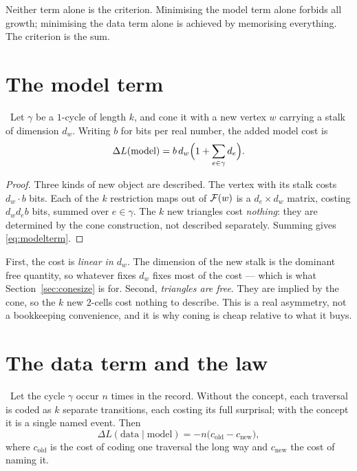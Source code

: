 Neither term alone is the criterion. Minimising the model term alone
forbids all growth; minimising the data term alone is achieved by
memorising everything. The criterion is the sum.

\section{The model term}

\begin{proposition}\label{prop:modelterm}
\Proved\ Let $\gamma$ be a $1$-cycle of length $k$, and cone it with a
new vertex $w$ carrying a stalk of dimension $d_w$. Writing $b$ for bits
per real number, the added model cost is
\begin{equation}\label{eq:modelterm}
  \Delta L(\text{model})
  =b\,d_w\Bigl(1+\sum_{e\in\gamma}d_e\Bigr).
\end{equation}
\end{proposition}
\begin{proof}
Three kinds of new object are described. The vertex with its stalk costs
$d_w\cdot b$ bits. Each of the $k$ restriction maps out of $\mathcal{F}(w)$
is a $d_e\times d_w$ matrix, costing $d_w d_e b$ bits, summed over
$e\in\gamma$. The $k$ new triangles cost \emph{nothing}: they are
determined by the cone construction, not described separately. Summing
gives \eqref{eq:modelterm}.
\end{proof}

\begin{remark}
First, the cost is \emph{linear in $d_w$}. The dimension of the new
stalk is the dominant free quantity, so whatever fixes $d_w$ fixes most
of the cost --- which is what Section~\ref{sec:conesize} is for.
Second, \emph{triangles are free}. They are implied by the cone, so the
$k$ new $2$-cells cost nothing to describe. This is a real asymmetry,
not a bookkeeping convenience, and it is why coning is cheap relative to
what it buys.
\end{remark}

\section{The data term and the law}

\begin{proposition}\label{prop:dataterm}
\Proved\ Let the cycle $\gamma$ occur $n$ times in the record. Without
the concept, each traversal is coded as $k$ separate transitions, each
costing its full surprisal; with the concept it is a single named event.
Then
\begin{equation}\label{eq:dataterm}
  \Delta L(\text{data}\mid\text{model})=-n\bigl(c_{\text{old}}-c_{\text{new}}\bigr),
\end{equation}
where $c_{\text{old}}$ is the cost of coding one traversal the long way
and $c_{\text{new}}$ the cost of naming it.
\end{proposition}


